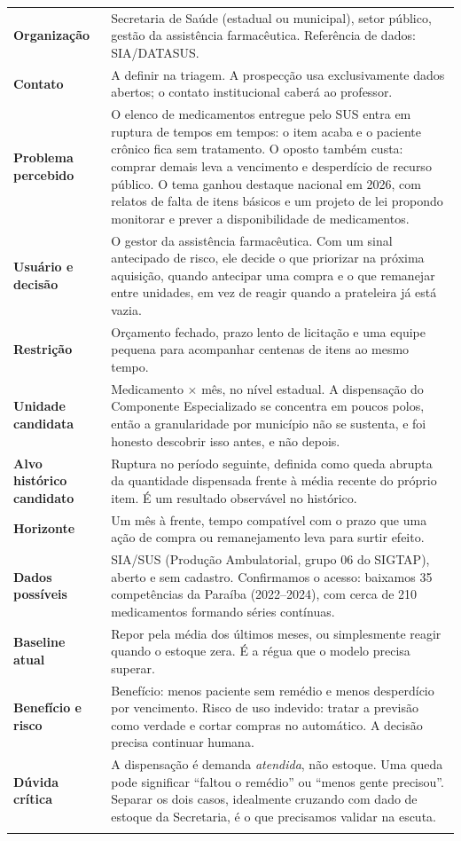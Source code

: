 \documentclass[11pt,a4paper]{article}
\newcommand{\campo}[2]{\textbf{#1} & #2 \\ \addlinespace[1pt]}
\begin{document}
\begin{tabularx}{\textwidth}{@{}L X@{}}
\toprule
\campo{Organização}{Secretaria de Saúde (estadual ou municipal), setor público, gestão da assistência farmacêutica. Referência de dados: SIA/DATASUS.}
\campo{Contato}{A definir na triagem. A prospecção usa exclusivamente dados abertos; o contato institucional caberá ao professor.}
\campo{Problema percebido}{O elenco de medicamentos entregue pelo SUS entra em ruptura de tempos em tempos: o item acaba e o paciente crônico fica sem tratamento. O oposto também custa: comprar demais leva a vencimento e desperdício de recurso público. O tema ganhou destaque nacional em 2026, com relatos de falta de itens básicos e um projeto de lei propondo monitorar e prever a disponibilidade de medicamentos.}
\campo{Usuário e decisão}{O gestor da assistência farmacêutica. Com um sinal antecipado de risco, ele decide o que priorizar na próxima aquisição, quando antecipar uma compra e o que remanejar entre unidades, em vez de reagir quando a prateleira já está vazia.}
\campo{Restrição}{Orçamento fechado, prazo lento de licitação e uma equipe pequena para acompanhar centenas de itens ao mesmo tempo.}
\campo{Unidade candidata}{Medicamento $\times$ mês, no nível estadual. A dispensação do Componente Especializado se concentra em poucos polos, então a granularidade por município não se sustenta, e foi honesto descobrir isso antes, e não depois.}
\campo{Alvo histórico candidato}{Ruptura no período seguinte, definida como queda abrupta da quantidade dispensada frente à média recente do próprio item. É um resultado observável no histórico.}
\campo{Horizonte}{Um mês à frente, tempo compatível com o prazo que uma ação de compra ou remanejamento leva para surtir efeito.}
\campo{Dados possíveis}{SIA/SUS (Produção Ambulatorial, grupo 06 do SIGTAP), aberto e sem cadastro. Confirmamos o acesso: baixamos 35 competências da Paraíba (2022--2024), com cerca de 210 medicamentos formando séries contínuas.}
\campo{Baseline atual}{Repor pela média dos últimos meses, ou simplesmente reagir quando o estoque zera. É a régua que o modelo precisa superar.}
\campo{Benefício e risco}{Benefício: menos paciente sem remédio e menos desperdício por vencimento. Risco de uso indevido: tratar a previsão como verdade e cortar compras no automático. A decisão precisa continuar humana.}
\campo{Dúvida crítica}{A dispensação é demanda \emph{atendida}, não estoque. Uma queda pode significar ``faltou o remédio'' ou ``menos gente precisou''. Separar os dois casos, idealmente cruzando com dado de estoque da Secretaria, é o que precisamos validar na escuta.}
\bottomrule
\end{tabularx}
\end{document}
